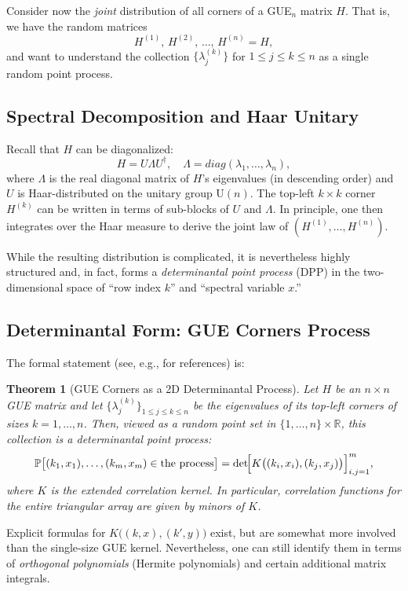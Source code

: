 \documentclass[letterpaper,11pt,oneside,reqno]{article}
\numberwithin{equation}{section}
\newtheorem{theorem}[proposition]{Theorem}
\theoremstyle{definition}
\begin{document}
Consider now the \emph{joint} distribution of all corners of a GUE$_n$ matrix $H$. That is, we have the random matrices
\[
	H^{(1)},\,H^{(2)},\,\dots,\,H^{(n)}=H,
\]
and want to understand the collection $\{\lambda_j^{(k)}\}$ for $1\le j\le k\le n$ as a single random point process.

\subsection{Spectral Decomposition and Haar Unitary}
Recall that $H$ can be diagonalized:
\[
	H = U \Lambda U^\dagger,
	\quad
	\Lambda = diag(\lambda_1,\dots,\lambda_n),
\]
where $\Lambda$ is the real diagonal matrix of $H$'s eigenvalues (in descending order) and $U$ is Haar-distributed on the unitary group $\mathrm{U}(n)$. The top-left $k\times k$ corner $H^{(k)}$ can be written in terms of sub-blocks of $U$ and $\Lambda$. In principle, one then integrates over the Haar measure to derive the joint law of $(H^{(1)},\dots,H^{(n)})$.

While the resulting distribution is complicated, it is nevertheless highly structured and, in fact, forms a \emph{determinantal point process} (DPP) in the two-dimensional space of ``row index $k$'' and ``spectral variable $x$.''

\subsection{Determinantal Form: GUE Corners Process}
The formal statement (see, e.g., \cite{Johansson-2005,Johansson-2006,baryshnikov2001gues,forrester2010log} for references) is:

\begin{theorem}[GUE Corners as a 2D Determinantal Process]
\label{thm:gue-corners-det}
Let $H$ be an $n\times n$ GUE matrix and let $\{\lambda_j^{(k)}\}_{1\le j\le k\le n}$ be the eigenvalues of its top-left corners of sizes $k=1,\dots,n$. Then, viewed as a random point set in $\{1,\dots,n\}\times\mathbb{R}$, this collection is a \emph{determinantal point process}:
\[
	\mathbb{P}\bigl[(k_1,x_1),\dots,(k_m,x_m)\in \text{the process}\bigr]
	= \det\!\Bigl[K\bigl((k_i,x_i),(k_j,x_j)\bigr)\Bigr]_{i,j=1}^m,
\]
where $K$ is the \emph{extended correlation kernel}. In particular, correlation functions for the entire triangular array are given by minors of $K$.
\end{theorem}

Explicit formulas for $K\bigl((k,x),(k',y)\bigr)$ exist, but are somewhat more involved than the single-size GUE kernel. Nevertheless, one can still identify them in terms of \emph{orthogonal polynomials} (Hermite polynomials) and certain additional matrix integrals.
\end{document}
